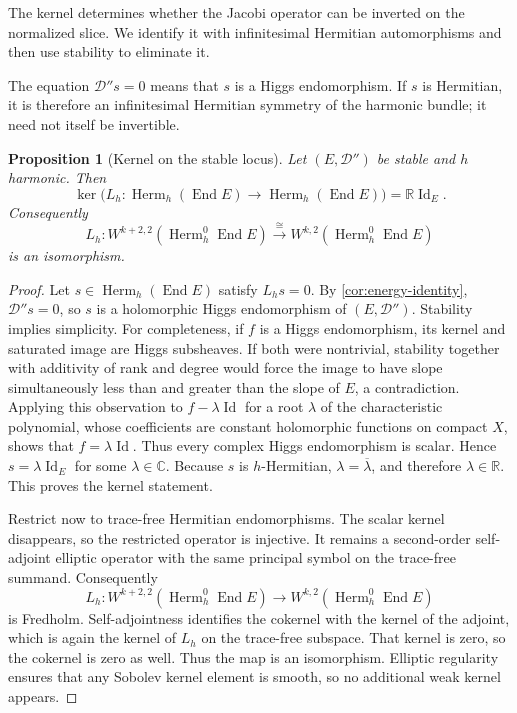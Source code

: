 \documentclass[11pt,reqno]{amsart}
\newtheorem{proposition}[theorem]{Proposition}
\theoremstyle{definition}
\theoremstyle{remark}
\newcommand{\C}{\mathbb C}
\newcommand{\R}{\mathbb R}
\newcommand{\cD}{\mathcal D}
\newcommand{\End}{\operatorname{End}}
\newcommand{\Herm}{\operatorname{Herm}}
\newcommand{\Id}{\operatorname{Id}}
\begin{document}
The kernel determines whether the Jacobi operator can be inverted on the normalized slice.  We identify it with infinitesimal Hermitian automorphisms and then use stability to eliminate it.


The equation $\cD''s=0$ means that $s$ is a Higgs endomorphism.  If $s$
is Hermitian, it is therefore an infinitesimal Hermitian symmetry of
the harmonic bundle; it need not itself be invertible.

\begin{proposition}[Kernel on the stable locus]\label{prop:stable-kernel}
Let $(E,\cD'')$ be stable and $h$ harmonic.  Then
\[
  \ker\bigl(L_h:\Herm_h(\End E)\to\Herm_h(\End E)\bigr)
  =\R\Id_E.
\]
Consequently
\begin{equation}\label{eq:tracefree-invertible}
  L_h:
  W^{k+2,2}(\Herm_h^0\End E)
  \xrightarrow{\cong}
  W^{k,2}(\Herm_h^0\End E)
\end{equation}
is an isomorphism.
\end{proposition}

\begin{proof}
Let $s\in\Herm_h(\End E)$ satisfy $L_hs=0$.  By
\cref{cor:energy-identity}, $\cD''s=0$, so $s$ is a holomorphic Higgs
endomorphism of $(E,\cD'')$.  Stability implies simplicity.  For
completeness, if $f$ is a Higgs endomorphism, its kernel and saturated
image are Higgs subsheaves.  If both were nontrivial, stability together
with additivity of rank and degree would force the image to have slope
simultaneously less than and greater than the slope of $E$, a
contradiction.  Applying this observation to $f-\lambda\Id$ for a root
$\lambda$ of the characteristic polynomial, whose coefficients are
constant holomorphic functions on compact $X$, shows that
$f=\lambda\Id$.  Thus every complex Higgs endomorphism is scalar.
Hence $s=\lambda\Id_E$ for some $\lambda\in\C$.  Because $s$ is
$h$-Hermitian, $\lambda=\overline\lambda$, and therefore
$\lambda\in\R$.  This proves the kernel statement.

Restrict now to trace-free Hermitian endomorphisms.  The scalar kernel
disappears, so the restricted operator is injective.  It remains a
second-order self-adjoint elliptic operator with the same principal
symbol on the trace-free summand.  Consequently
\[
  L_h:W^{k+2,2}(\Herm_h^0\End E)
  \longrightarrow W^{k,2}(\Herm_h^0\End E)
\]
is Fredholm.  Self-adjointness identifies the cokernel with the kernel
of the adjoint, which is again the kernel of $L_h$ on the trace-free
subspace.  That kernel is zero, so the cokernel is zero as well.  Thus
the map is an isomorphism.  Elliptic regularity ensures that any Sobolev
kernel element is smooth, so no additional weak kernel appears.
\end{proof}
\end{document}
